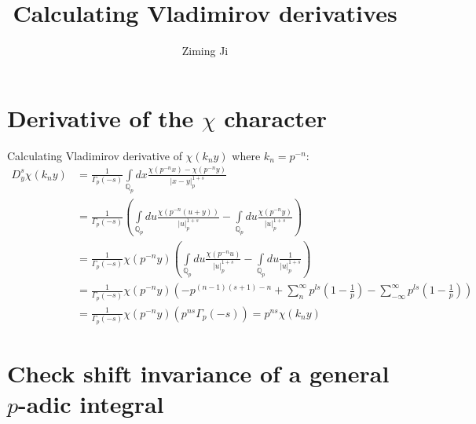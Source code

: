\documentclass[12pt]{article}
\begin{document}
 
\title{Calculating Vladimirov derivatives}
\author{Ziming Ji}
 
\maketitle
 
\section{Derivative of the $\chi$ character}
Calculating Vladimirov derivative of $\chi(k_ny)$ where $k_n=p^{-n}$:
\begin{equation}
\begin{aligned}
D^s_y \chi(k_n y)&=\frac{1}{\Gamma_p (-s)} \int\limits _{\mathbb{Q}_p}dx \frac{\chi( p^{-n} x) - \chi( p^{-n}y)}{|x-y|_p^{1+s}}\\
&=\frac{1}{\Gamma_p (-s)} \left(\int\limits _{\mathbb{Q}_p}du \frac{\chi( p^{-n} (u+y))}{|u|_p^{1+s}}-\int\limits _{\mathbb{Q}_p}du \frac{\chi( p^{-n} y)}{|u|_p^{1+s}}\right)\\
&=\frac{1}{\Gamma_p (-s)} \chi( p^{-n} y)\left(\int\limits _{\mathbb{Q}_p}du \frac{\chi( p^{-n} u)}{|u|_p^{1+s}}-\int\limits _{\mathbb{Q}_p}du \frac{1}{|u|_p^{1+s}}\right)\\
&=\frac{1}{\Gamma_p (-s)} \chi( p^{-n} y)\left(-p^{(n-1)(s+1)-n}+\sum\limits_n^\infty p^{ls}(1-\frac{1}{p})-\sum\limits_{-\infty}^\infty p^{ls}(1-\frac{1}{p})\right)\\
&=\frac{1}{\Gamma_p (-s)} \chi( p^{-n} y)\left(p^{ns}\Gamma_p(-s)\right)=p^{ns}\chi(k_n y)
\end{aligned}
\end{equation}

\section{Check shift invariance of a general $p$-adic integral}
\end{document}
